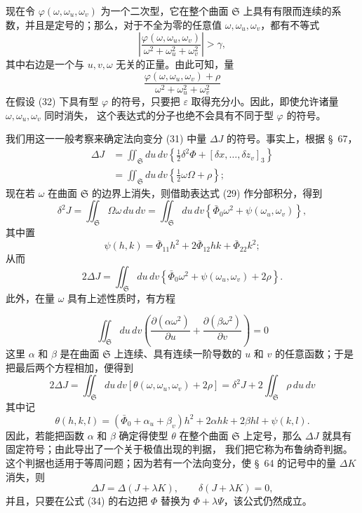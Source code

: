 \documentclass[11pt,a4paper,leqno]{article}
\begin{document}
现在令 $\varphi(\omega,\omega_u,\omega_v)$ 为一个二次型，它在整个曲面
$\mathfrak{S}$ 上具有有限而连续的系数，并且是定号的；那么，对于不全为零的任意值
$\omega,\omega_u,\omega_v$，都有不等式
\[
\left|\frac{\varphi(\omega,\omega_u,\omega_v)}
{\omega^2+\omega_u^2+\omega_v^2}\right|>\gamma,
\]
其中右边是一个与 $u,v,\omega$ 无关的正量。由此可知，量
\[
\frac{\varphi(\omega,\omega_u,\omega_v)+\rho}
{\omega^2+\omega_u^2+\omega_v^2}
\]
在假设 (32) 下具有型 $\varphi$ 的符号，只要把 $\varepsilon$ 取得充分小。因此，即使允许诸量 $\omega,\omega_u,\omega_v$ 同时消失，
这个表达式的分子也绝不会具有不同于型 $\varphi$ 的符号。

我们用这一一般考察来确定法向变分 (31) 中量 $\Delta J$ 的符号。事实上，根据
\S~67，
\[
\begin{aligned}
\Delta J
&=\iint_{\mathfrak{S}}du\,dv
\left\{\tfrac12\delta^2\Phi+[\delta x,\ldots,\delta z_v]_3\right\}\\
&=\iint_{\mathfrak{S}}du\,dv\left\{\tfrac12\omega\Omega+\rho\right\};
\end{aligned}
\]
现在若 $\omega$ 在曲面 $\mathfrak{S}$ 的边界上消失，则借助表达式 (29) 作分部积分，得到
\begin{equation}\tag{33}
\delta^2J=\iint_{\mathfrak{S}}\Omega\omega\,du\,dv
=\iint_{\mathfrak{S}}du\,dv
\left\{\bar\Phi_0\omega^2+\psi(\omega_u,\omega_v)\right\},
\end{equation}
其中置
\[
\psi(h,k)=\bar\Phi_{11}h^2+2\bar\Phi_{12}hk+\bar\Phi_{22}k^2;
\]
从而
\[
2\Delta J=\iint_{\mathfrak{S}}du\,dv
\left\{\bar\Phi_0\omega^2+\psi(\omega_u,\omega_v)+2\rho\right\}.
\]
此外，在量 $\omega$ 具有上述性质时，有方程

\[
\iint_{\mathfrak{S}}du\,dv
\left(\frac{\partial(\alpha\omega^2)}{\partial u}
+\frac{\partial(\beta\omega^2)}{\partial v}\right)=0
\]
这里 $\alpha$ 和 $\beta$ 是在曲面 $\mathfrak{S}$ 上连续、具有连续一阶导数的
$u$ 和 $v$ 的任意函数；于是把最后两个方程相加，便得到
\begin{equation}\tag{34}
2\Delta J=\iint_{\mathfrak{S}}du\,dv
[\theta(\omega,\omega_u,\omega_v)+2\rho]
=\delta^2J+2\iint_{\mathfrak{S}}\rho\,du\,dv
\end{equation}
其中记
\[
\theta(h,k,l)=(\bar\Phi_0+\alpha_u+\beta_v)h^2
+2\alpha hk+2\beta hl+\psi(k,l).
\]
因此，若能把函数 $\alpha$ 和 $\beta$ 确定得使型 $\theta$ 在整个曲面
$\mathfrak{S}$ 上定号，那么 $\Delta J$ 就具有固定符号；由此导出了一个关于极值出现的判据，
我们把它称为布鲁纳奇判据。这个判据也适用于等周问题；因为若有一个法向变分，使 \S~64
的记号中的量 $\Delta K$ 消失，则
\[
\Delta J=\Delta(J+\lambda K),\qquad \delta(J+\lambda K)=0,
\]
并且，只要在公式 (34) 的右边把 $\Phi$ 替换为 $\Phi+\lambda\Psi$，该公式仍然成立。
\end{document}
